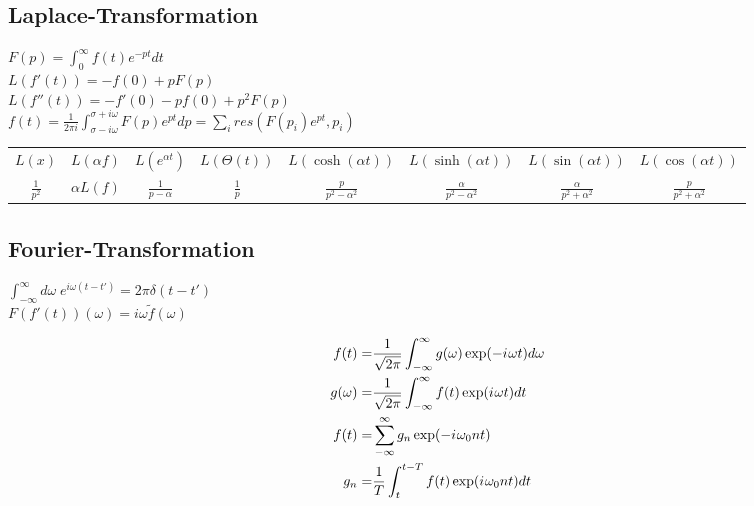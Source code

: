 \documentclass[12pt,a4paper]{article}
\newcommand{\iu}{{i\mkern1mu}}
\renewcommand{\=}[1]{\stackrel{#1}{=}}
\theoremstyle{definition}
\theoremstyle{remark}
\begin{document}
\begin{center}
\begin{minipage}[t]{.6\linewidth}
\vspace{0pt}

\subsection{Laplace-Transformation}
$F(p) = \int_0^{\infty} f(t) e^{-pt}dt$\\
$L(f'(t)) = -f(0) + p F(p)$\\
$L(f''(t)) = - f'(0) - p f(0) + p^2 F(p)$\\
$f(t) = \frac{1}{2\pi i}\int_{\sigma - i \omega}^{\sigma + i \omega} F(p) e^{pt}dp = \sum_i res (F(p_i) e^{pt}, p_i)$\\

\setlength\tabcolsep{2.5pt}
\noindent\begin{tabular}{cccccccc}
$L(x)$ & $L(\alpha f)$ & $L(e^{\alpha t})$ & $L(\Theta(t))$ & $L(\cosh(\alpha t))$ & $L(\sinh(\alpha t))$ & $L(\sin(\alpha t))$ & $L(\cos(\alpha t))$\\
$\frac{1}{p^2}$ & $\alpha L(f)$ & $\frac{1}{p-\alpha}$ & $\frac{1}{p}$ & $\frac{p}{p^2 - \alpha^2}$ & $\frac{\alpha}{p^2 - \alpha^2}$ & $\frac{\alpha}{p^2 + \alpha^2}$ & $\frac{p}{p^2 + \alpha^2}$\\
\end{tabular}

\end{minipage}%
\begin{minipage}[t]{.4\linewidth}
\vspace{0pt}
\subsection{Fourier-Transformation}

$\int_{-\infty}^{\infty} d\omega \; e^{i\omega (t - t')} = 2\pi \delta(t-t')$\\
$F(f'(t))(\omega) = i\omega \tilde f(\omega)$

\begin{framed}
\begin{align*}
f(t) =& \frac{1}{\sqrt{2\pi}} \int_{-\infty}^{\infty} g(\omega) \exp(-\iu \omega t) d\omega\\
g(\omega) =& \frac{1}{\sqrt{2\pi}} \int_{-\infty}^{\infty} f(t) \exp (\iu \omega t) dt\\
f(t) =& \sum_{-\infty}^{\infty} g_n \exp(- \iu \omega_0 n t)\\
g_n =& \frac{1}{T} \int_{t}^{t-T} f(t) \exp(\iu \omega_0 n t) dt
\end{align*}
\end{framed}

\end{minipage}
\end{center}
\end{document}
